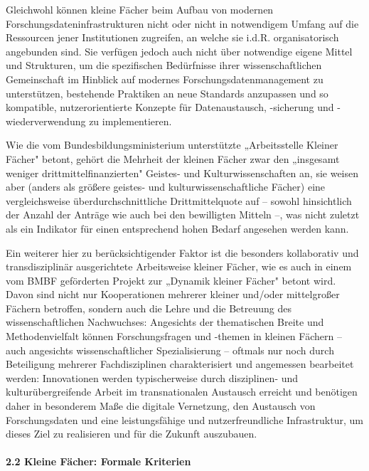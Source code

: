 Gleichwohl können kleine Fächer beim Aufbau von modernen
Forschungsdateninfrastrukturen nicht oder nicht in notwendigem Umfang
auf die Ressourcen jener Institutionen zugreifen, an welche sie i.d.R.
organisatorisch angebunden sind. Sie verfügen jedoch auch nicht über
notwendige eigene Mittel und Strukturen, um die spezifischen Bedürfnisse
ihrer wissenschaftlichen Gemeinschaft im Hinblick auf modernes
Forschungsdatenmanagement zu unterstützen, bestehende Praktiken an neue
Standards anzupassen und so kompatible, nutzerorientierte Konzepte für
Datenaustausch, -sicherung und -wiederverwendung zu implementieren.

Wie die vom Bundesbildungsministerium unterstützte „Arbeitsstelle
Kleiner Fächer" betont, gehört die Mehrheit der kleinen Fächer zwar den
„insgesamt weniger drittmittelfinanzierten" Geistes- und
Kulturwissenschaften an, sie weisen aber (anders als größere geistes-
und kulturwissenschaftliche Fächer) eine vergleichsweise
überdurchschnittliche Drittmittelquote auf -- sowohl hinsichtlich der
Anzahl der Anträge wie auch bei den bewilligten Mitteln --, was nicht
zuletzt als ein Indikator für einen entsprechend hohen Bedarf angesehen
werden kann.

Ein weiterer hier zu berücksichtigender Faktor ist die besonders
kollaborativ und transdisziplinär ausgerichtete Arbeitsweise kleiner
Fächer, wie es auch in einem vom BMBF geförderten Projekt zur „Dynamik
kleiner Fächer" betont wird. Davon sind nicht nur Kooperationen mehrerer
kleiner und/oder mittelgroßer Fächern betroffen, sondern auch die Lehre
und die Betreuung des wissenschaftlichen Nachwuchses: Angesichts der
thematischen Breite und Methodenvielfalt können Forschungsfragen und
-themen in kleinen Fächern -- auch angesichts wissenschaftlicher
Spezialisierung -- oftmals nur noch durch Beteiligung mehrerer
Fachdisziplinen charakterisiert und angemessen bearbeitet werden:
Innovationen werden typischerweise durch disziplinen- und
kulturübergreifende Arbeit im transnationalen Austausch erreicht und
benötigen daher in besonderem Maße die digitale Vernetzung, den
Austausch von Forschungsdaten und eine leistungsfähige und
nutzerfreundliche Infrastruktur, um dieses Ziel zu realisieren und für
die Zukunft auszubauen.

\hypertarget{kleine-fuxe4cher-formale-kriterien-1}{%
\paragraph{2.2 Kleine Fächer: Formale
Kriterien}\label{kleine-fuxe4cher-formale-kriterien-1}}

